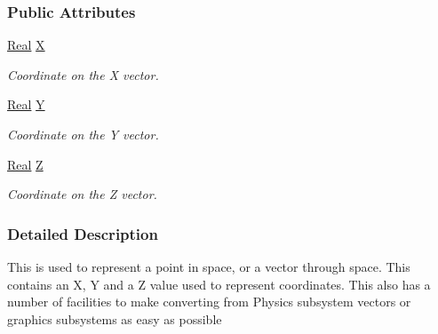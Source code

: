 \subsubsection*{Public Attributes}
\begin{DoxyCompactItemize}
\item 
\hypertarget{classphys_1_1Vector3_a23660f9d1e21a25c53aa06aa737bb56b}{
\hyperlink{namespacephys_af7eb897198d265b8e868f45240230d5f}{Real} \hyperlink{classphys_1_1Vector3_a23660f9d1e21a25c53aa06aa737bb56b}{X}}
\label{d5/d6a/classphys_1_1Vector3_a23660f9d1e21a25c53aa06aa737bb56b}

\begin{DoxyCompactList}\small\item\em Coordinate on the X vector. \item\end{DoxyCompactList}\item 
\hypertarget{classphys_1_1Vector3_a6c9bc2ab0995d5056dba8272c650e58e}{
\hyperlink{namespacephys_af7eb897198d265b8e868f45240230d5f}{Real} \hyperlink{classphys_1_1Vector3_a6c9bc2ab0995d5056dba8272c650e58e}{Y}}
\label{d5/d6a/classphys_1_1Vector3_a6c9bc2ab0995d5056dba8272c650e58e}

\begin{DoxyCompactList}\small\item\em Coordinate on the Y vector. \item\end{DoxyCompactList}\item 
\hypertarget{classphys_1_1Vector3_a53c84fa4b38fb9c4a4d822b04c200b13}{
\hyperlink{namespacephys_af7eb897198d265b8e868f45240230d5f}{Real} \hyperlink{classphys_1_1Vector3_a53c84fa4b38fb9c4a4d822b04c200b13}{Z}}
\label{d5/d6a/classphys_1_1Vector3_a53c84fa4b38fb9c4a4d822b04c200b13}

\begin{DoxyCompactList}\small\item\em Coordinate on the Z vector. \item\end{DoxyCompactList}\end{DoxyCompactItemize}


\subsubsection{Detailed Description}
This is used to represent a point in space, or a vector through space. This contains an X, Y and a Z value used to represent coordinates. This also has a number of facilities to make converting from Physics subsystem vectors or graphics subsystems as easy as possible 

